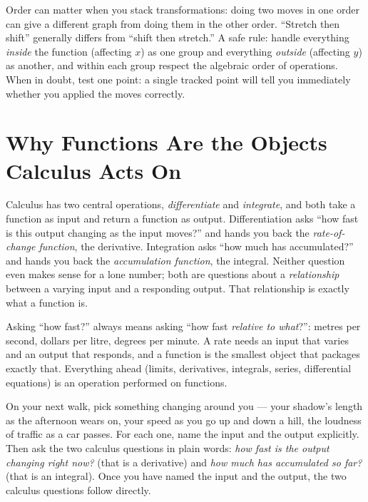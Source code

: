 \begin{trapbox}
Order can matter when you stack transformations: doing two moves in one order can
give a different graph from doing them in the other order.
``Stretch then shift'' generally differs from ``shift then stretch.'' A
safe rule: handle everything \emph{inside} the function (affecting $x$) as one
group and everything \emph{outside} (affecting $y$) as another, and within each
group respect the algebraic order of operations. When in doubt, test one point: a
single tracked point will tell you immediately whether you applied the moves
correctly.
\end{trapbox}

\section{Why Functions Are the Objects Calculus Acts On}
\label{ch02:why-functions}

Calculus has
two central operations, \emph{differentiate} and \emph{integrate}, and both take a
function as input and return a function as output. Differentiation asks ``how fast
is this output changing as the input moves?'' and hands you back the
\emph{rate-of-change function}, the derivative. Integration asks ``how much has
accumulated?'' and hands you back the \emph{accumulation function}, the integral.
Neither question even makes sense for a lone number; both are questions about a
\emph{relationship} between a varying input and a responding output. That
relationship is exactly what a function is.

\begin{happeningbox}
Asking ``how fast?'' always means asking ``how fast \emph{relative to what}?'':
metres per second, dollars per litre, degrees per minute. A rate needs an input
that varies and an output that responds, and a function is the smallest object
that packages exactly that. Everything ahead (limits, derivatives, integrals,
series, differential equations) is an operation performed on functions.
\end{happeningbox}

\begin{walkbox}
On your next walk, pick something changing around you --- your shadow's length as
the afternoon wears on, your speed as you go up and down a hill, the loudness of
traffic as a car passes. For each one, name the input and the output explicitly.
Then ask the two calculus questions in plain words: \emph{how fast is the output
changing right now?} (that is a derivative) and \emph{how much has accumulated so
far?} (that is an integral). Once you have named the input and the output, the
two calculus questions follow directly.
\end{walkbox}

